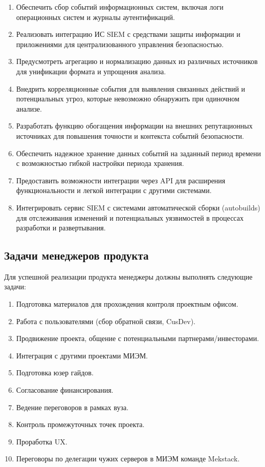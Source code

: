 \documentclass[14pt, a4paper]{extarticle}
\begin{document}
\begin{enumerate}
\item Обеспечить сбор событий информационных систем, включая логи операционных систем и журналы аутентификаций.
\item Реализовать интеграцию ИС SIEM с средствами защиты информации и приложениями для централизованного управления безопасностью.
\item Предусмотреть агрегацию и нормализацию данных из различных источников для унификации формата и упрощения анализа.
\item Внедрить корреляционные события для выявления связанных действий и потенциальных угроз, которые невозможно обнаружить при одиночном анализе.
\item Разработать функцию обогащения информации на внешних репутационных источниках для повышения точности и контекста событий безопасности.
\item Обеспечить надежное хранение данных событий на заданный период времени с возможностью гибкой настройки периода хранения.
\item Предоставить возможности интеграции через API для расширения функциональности и легкой интеграции с другими системами.
\item Интегрировать сервис SIEM с системами автоматической сборки (autobuilds) для отслеживания изменений и потенциальных уязвимостей в процессах разработки и развертывания.
\end{enumerate}

\subsection{Задачи менеджеров продукта}

Для успешной реализации продукта менеджеры должны выполнять следующие задачи:

\begin{enumerate}
\item Подготовка материалов для прохождения контроля проектным офисом.
\item Работа с пользователями (сбор обратной связи, CusDev).
\item Продвижение проекта, общение с потенциальными партнерами/инвесторами.
\item Интеграция с другими проектами МИЭМ.
\item Подготовка юзер гайдов.
\item Согласование финансирования.
\item Ведение переговоров в рамках вуза.
\item Контроль промежуточных точек проекта.
\item Проработка UX.
\item Переговоры по делегации чужих серверов в МИЭМ команде Mekstack.
\end{enumerate}
\end{document}
